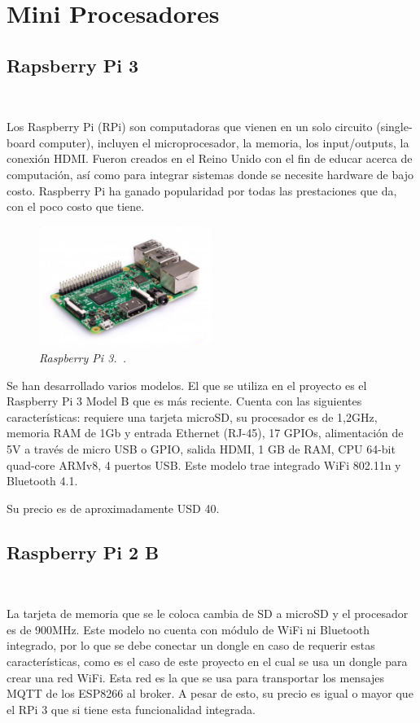 \section{Mini Procesadores}

\subsection{Rapsberry Pi 3} ~

Los Raspberry Pi  (RPi) son computadoras que vienen en un solo circuito (single-board computer), incluyen el microprocesador, la memoria, los input/outputs, la conexión HDMI. Fueron creados en el Reino Unido con el fin de educar acerca de computación, así como para integrar sistemas donde se necesite hardware de bajo costo. Raspberry Pi ha ganado popularidad por todas las prestaciones que da, con el poco costo que tiene.

\begin{figure}[h!]
  \centering
  \includegraphics[width=0.5\textwidth, keepaspectratio]{images/rpi3}
  \caption{\textit{Raspberry Pi 3.~\cite{RPi3}.}}
  \label{fig:rpi3}
\end{figure}

Se han desarrollado varios modelos. El que se utiliza en el proyecto es el Raspberry Pi 3 Model B que es más reciente. Cuenta con las siguientes características: requiere una tarjeta microSD, su procesador es de 1,2GHz, memoria RAM de 1Gb y  entrada Ethernet (RJ-45), 17 GPIOs, alimentación de 5V a través de micro USB o GPIO, salida HDMI, 1 GB de RAM, CPU 64-bit quad-core ARMv8, 4 puertos USB. Este modelo trae integrado WiFi 802.11n y Bluetooth 4.1.

Su precio es de aproximadamente USD 40.

\subsection{Raspberry Pi 2 B} ~

La tarjeta de memoria que se le coloca cambia de SD a microSD y el procesador es de 900MHz. Este modelo no cuenta con módulo de WiFi ni Bluetooth integrado, por lo que se debe conectar un dongle en caso de requerir estas características, como es el caso de este proyecto en el cual se usa un dongle para crear una red WiFi. Esta red es la que se usa para transportar los mensajes MQTT de los ESP8266 al broker. A pesar de esto, su precio es igual o mayor que el RPi 3 que si tiene esta funcionalidad integrada.

